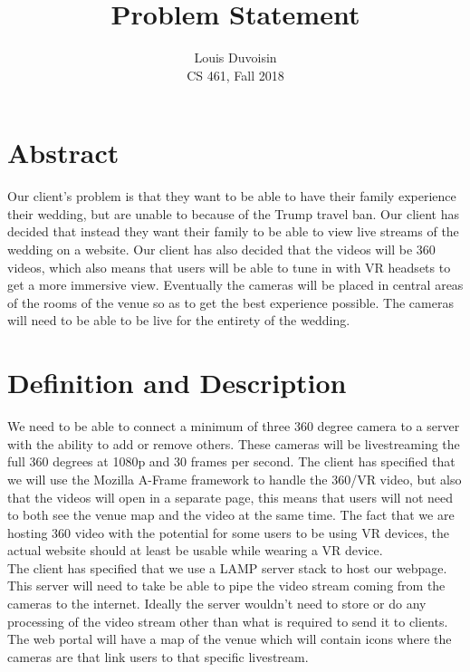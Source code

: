 \documentclass[10pt,draftclsnofoot,onecolumn]{IEEEtran}
\title{Problem Statement}
\author{Louis Duvoisin \\ CS 461, Fall 2018}
\begin{document}
\maketitle

\section{Abstract}
Our client's problem is that they want to be able to have their family experience their wedding, but are unable to because of the Trump travel ban. Our client has decided that instead they want their family to be able to view live streams of the wedding on a website. Our client has also decided that the videos will be 360 videos, which also means that users will be able to tune in with VR headsets to get a more immersive view. Eventually the cameras will be placed in central areas of the rooms of the venue so as to get the best experience possible. The cameras will need to be able to be live for the entirety of the wedding.

\newpage
\section{Definition and Description}
We need to be able to connect a minimum of three 360 degree camera to a server with the ability to add or remove others. These cameras will be livestreaming the full 360 degrees at 1080p and 30 frames per second. The client has specified that we will use the Mozilla A-Frame framework to handle the 360/VR video, but also that the videos will open in a separate page, this means that users will not need to both see the venue map and the video at the same time. The fact that we are hosting 360 video with the potential for some users to be using VR devices, the actual website should at least be usable while wearing a VR device.\\
The client has specified that we use a LAMP server stack to host our webpage. This server will need to take be able to pipe the video stream coming from the cameras to the internet. Ideally the server wouldn't need to store or do any processing of the video stream other than what is required to send it to clients. The web portal will have a map of the venue which  will contain icons where the cameras are that link users to that specific livestream.
\end{document}
